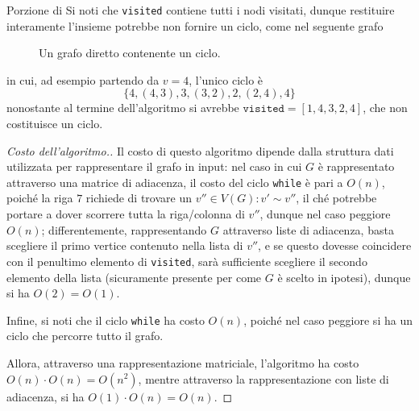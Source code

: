 \documentclass[a4paper, 12pt]{report}
\begin{document}
    \begin{framedobs}{Porzione di }
        Si noti che \texttt{visited} contiene tutti i nodi visitati, dunque restituire interamente l'insieme potrebbe non fornire un ciclo, come nel seguente grafo
        \begin{figure}[H]
            \centering
            \caption{Un grafo diretto contenente un ciclo.}
        \end{figure}

        in cui, ad esempio partendo da $v= 4$, l'unico ciclo è $$\{4, (4, 3), 3, (3, 2), 2, (2, 4), 4\}$$ nonostante al termine dell'algoritmo si avrebbe $\texttt{visited}=[1, 4, 3, 2, 4]$, che non costituisce un ciclo.
    \end{framedobs}

    \begin{proof}[Costo dell'algoritmo.]
        Il costo di questo algoritmo dipende dalla struttura dati utilizzata per rappresentare il grafo in input: nel caso in cui $G$ è rappresentato attraverso una matrice di adiacenza, il costo del ciclo \texttt{while} è pari a $O(n)$, poiché la riga $7$ richiede di trovare un $v'' \in V(G) : v' \sim v''$, il ché potrebbe portare a dover scorrere tutta la riga/colonna di $v''$, dunque nel caso peggiore $O(n)$; differentemente, rappresentando $G$ attraverso liste di adiacenza, basta scegliere il primo vertice contenuto nella lista di $v''$, e se questo dovesse coincidere con il penultimo elemento di \texttt{visited}, sarà sufficiente scegliere il secondo elemento della lista (sicuramente presente per come $G$ è scelto in ipotesi), dunque si ha $O(2) = O(1)$.

        Infine, si noti che il ciclo \texttt{while} ha costo $O(n)$, poiché nel caso peggiore si ha un ciclo che percorre tutto il grafo.

        Allora, attraverso una rappresentazione matriciale, l'algoritmo ha costo $O(n) \cdot O(n) = O(n^2)$, mentre attraverso la rappresentazione con liste di adiacenza, si ha $O(1) \cdot O(n) = O(n)$.
    \end{proof}
\end{document}
